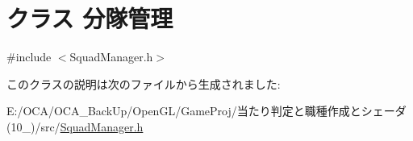 \hypertarget{class_xE5_x88_x86_xE9_x9A_x8A_xE7_xAE_xA1_xE7_x90_x86}{\section{クラス 分隊管理}
\label{class_xE5_x88_x86_xE9_x9A_x8A_xE7_xAE_xA1_xE7_x90_x86}
}


{\ttfamily \#include $<$Squad\-Manager.\-h$>$}



このクラスの説明は次のファイルから生成されました\-:\begin{DoxyCompactItemize}
\item 
E\-:/\-O\-C\-A/\-O\-C\-A\-\_\-\-Back\-Up/\-Open\-G\-L/\-Game\-Proj/当たり判定と職種作成とシェーダ(10\-\_)/src/\hyperlink{_squad_manager_8h}{Squad\-Manager.\-h}\end{DoxyCompactItemize}
